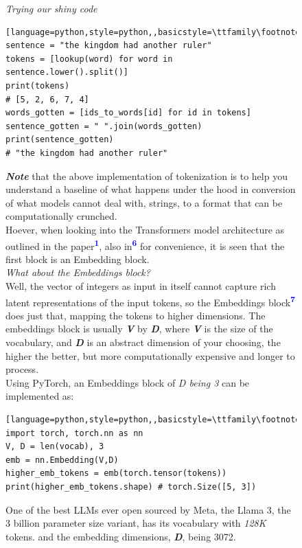 \documentclass[12pt]{article}
\newcommand{\customtext}[3]{%
    \vspace{#2} %
    \fontsize{13}{8}\textcolor{#1}{\textit{#3}}%
}
\newcommand{\bandi}[1]{\textbf{\textit{#1}}}
\newcommand{\sidecite}[1]{\textsuperscript{\textcolor{blue}{\textbf{\scriptsize#1}}}}
\begin{document}
\begin{figure}[!htb]
    \begin{minipage}[t]{0.65\textwidth}
    \raggedright
    \customtext{xtitle}{0em}{Trying our shiny code}\\
\begin{lstlisting}[language=python,style=python,,basicstyle=\ttfamily\footnotesize]
sentence = "the kingdom had another ruler"
tokens = [lookup(word) for word in sentence.lower().split()]
print(tokens)
# [5, 2, 6, 7, 4]
words_gotten = [ids_to_words[id] for id in tokens]
sentence_gotten = " ".join(words_gotten)
print(sentence_gotten)
# "the kingdom had another ruler"
\end{lstlisting}
\textbf{\textit{\small Note}} that the above implementation of tokenization is to help you understand a baseline of what happens 
under the hood in conversion of what models cannot deal with, strings, to a format that can be computationally 
crunched.\\
Hoever, when looking into the Transformers model architecture as outlined in the paper\sidecite{1}, also in\sidecite{6}
for convenience, it is seen that the first block is an Embedding block.\\
\customtext{xtitle}{1em}{What about the Embeddings block?}\\
Well, the vector of integers as input in itself cannot capture rich latent representations of the input tokens, 
so the Embeddings block\sidecite{7} does just that, mapping the tokens to higher dimensions. The embeddings block is usually 
\bandi{V} by \bandi{D}, where \bandi{V} is the size of the vocabulary, and \bandi{D} is an abstract dimension of your choosing, 
the higher the better, but more computationally expensive and longer to process.\\
Using PyTorch, an Embeddings block of {\it D being 3} can be implemented as:
\begin{lstlisting}[language=python,style=python,,basicstyle=\ttfamily\footnotesize]
import torch, torch.nn as nn 
V, D = len(vocab), 3
emb = nn.Embedding(V,D)
higher_emb_tokens = emb(torch.tensor(tokens))
print(higher_emb_tokens.shape) # torch.Size([5, 3])
\end{lstlisting}
One of the best LLMs ever open sourced by Meta, the Llama 3, the 3 billion parameter size variant, has its vocabulary with {\it 128K} tokens.
and the embedding dimensions, \bandi{D}, being 3072.
    \end{minipage}%
    \hspace{25pt}
    \begin{minipage}[t]{.4\textwidth}

\end{minipage}
\end{figure}
\end{document}
